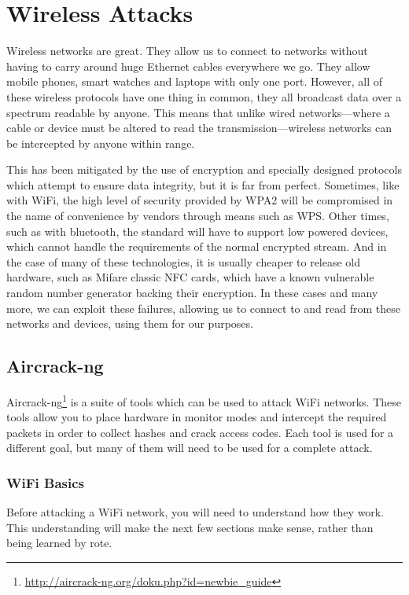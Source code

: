 \documentclass[a4paper,11pt]{report}
\begin{document}
\chapter{Wireless Attacks}
	\label{ch:WirelessAttacks}
	Wireless networks are great. 
	They allow us to connect to networks without having to carry around huge Ethernet cables everywhere we go. 
	They allow mobile phones, smart watches and laptops with only one port. 
	However, all of these wireless protocols have one thing in common, they all broadcast data over a spectrum readable by anyone. 
	This means that unlike wired networks---where a cable or device must be altered to read the transmission---wireless networks can be intercepted by anyone within range. 
	
	This has been mitigated by the use of encryption and specially designed protocols which attempt to ensure data integrity, but it is far from perfect. 
	Sometimes, like with WiFi, the high level of security provided by WPA2 will be compromised in the name of convenience by vendors through means such as WPS.
	Other times, such as with bluetooth, the standard will have to support low powered devices, which cannot handle the requirements of the normal encrypted stream. 
	And in the case of many of these technologies, it is usually cheaper to release old hardware, such as Mifare classic NFC cards, which have a known vulnerable random number generator backing their encryption. 
	In these cases and many more, we can exploit these failures, allowing us to connect to and read from these networks and devices, using them for our purposes. 
	\section{Aircrack-ng}
		Aircrack-ng\footnote{\url{http://aircrack-ng.org/doku.php?id=newbie\_guide}} is a suite of tools which can be used to attack WiFi networks. 
		These tools allow you to place hardware in monitor modes and intercept the required packets in order to collect hashes and crack access codes. 
		Each tool is used for a different goal, but many of them will need to be used for a complete attack. 
		\subsection{WiFi Basics}
			Before attacking a WiFi network, you will need to understand how they work. 
			This understanding will make the next few sections make sense, rather than being learned by rote.
\end{document}
